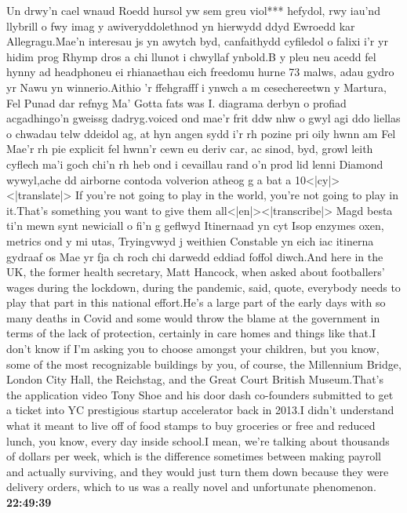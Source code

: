 \documentclass{article}%
\begin{document}
Un drwy'n cael wnaud Roedd hursol yw sem greu viol*** hefydol, rwy iau'nd llybrill o fwy imag y awiveryddolethnod yn hierwydd ddyd Ewroedd kar Allegragu.Mae'n interesau js yn awytch byd, canfaithydd cyfiledol o falixi i'r yr hidim prog Rhymp dros a chi llunot i chwyllaf ynbold.B y pleu neu acedd fel hynny ad headphoneu ei rhianaethau eich freedomu hurne 73 malws, adau gydro yr Nawu yn winnerio.Aithio 'r ffehgrafff i ynwch a m cesechereetwn y Martura, Fel Punad dar refnyg Ma' Gotta fats was I. diagrama derbyn o profiad acgadhingo'n gweissg dadryg.voiced ond mae'r frit ddw nhw o gwyl agi ddo liellas o chwadau telw ddeidol ag, at hyn angen sydd i'r rh pozine pri oily hwnn am Fel Mae'r rh pie explicit fel hwnn'r cewn eu deriv car, ac sinod, byd, growl leith cyflech ma'i goch chi'n rh heb ond i cevaillau rand o'n prod lid lenni Diamond wywyl,ache dd airborne contoda volverion atheog g a bat a 10<|cy|><|translate|> If you're not going to play in the world, you're not going to play in it.That's something you want to give them all<|en|><|transcribe|> Magd besta ti'n mewn synt newiciall o fi'n g geflwyd Itinernaad yn cyt Isop enzymes oxen, metrics ond y mi utas, Tryingvwyd j weithien Constable yn eich iac itinerna gydraaf os Mae yr fja ch roch chi darwedd eddiad foffol diwch.And here in the UK, the former health secretary, Matt Hancock, when asked about footballers' wages during the lockdown, during the pandemic, said, quote, everybody needs to play that part in this national effort.He's a large part of the early days with so many deaths in Covid and some would throw the blame at the government in terms of the lack of protection, certainly in care homes and things like that.I don't know if I'm asking you to choose amongst your children, but you know, some of the most recognizable buildings by you, of course, the Millennium Bridge, London City Hall, the Reichstag, and the Great Court British Museum.That's the application video Tony Shoe and his door dash co{-}founders submitted to get a ticket into YC prestigious startup accelerator back in 2013.I didn't understand what it meant to live off of food stamps to buy groceries or free and reduced lunch, you know, every day inside school.I mean, we're talking about thousands of dollars per week, which is the difference sometimes between making payroll and actually surviving, and they would just turn them down because they were delivery orders, which to us was a really novel and unfortunate phenomenon.%
\textbf{22:49:39}%
\newline%
\end{document}
